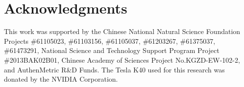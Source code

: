 \documentclass[10pt,twocolumn,letterpaper]{article}
\begin{document}
\section{Acknowledgments}
This work was supported by the Chinese National Natural Science Foundation Projects \#61105023, \#61103156, \#61105037, \#61203267, \#61375037, \#61473291, National Science and Technology Support Program Project \#2013BAK02B01, Chinese Academy of Sciences Project No.KGZD-EW-102-2, and AuthenMetric R\&D Funds.
The Tesla K40 used for this research was donated by the NVIDIA Corporation.

{\small


}
\end{document}
